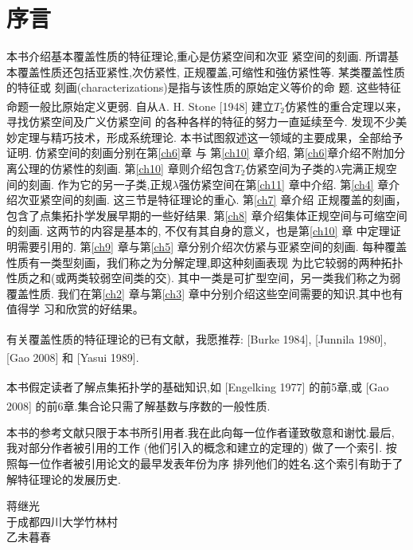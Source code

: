 \chapter*{序\quad 言}

\setcounter{page}{1}
\thispagestyle{empty}

本书介绍基本覆盖性质的特征理论,重心是仿紧空间和次亚
紧空间的刻画.
所谓基本覆盖性质还包括亚紧性,次仿紧性,
正规覆盖,可缩性和強仿紧性等.
某类覆盖性质的特征或
刻画(characterizations)是指与该性质的原始定义等价的命
题.
这些特征命题一般比原始定义更弱.
自从A. H. Stone [1948]\textsuperscript{\cite{Stone}}
建立$T_2$仿紧性的重合定理以来，寻找仿紧空间及广义仿紧空间
的各种各样的特征的努力一直延续至今.
发现不少美妙定理与精巧技术，形成系统理论.
本书试图叙述这一领域的主要成果，全部给予证明.
仿紧空间的刻画分别在第\ref{ch6}章 与
第\ref{ch10} 章介绍, 第\ref{ch6}章介绍不附加分离公理的仿紧性的刻画.
第\ref{ch10} 章则介绍包含$T_2$仿紧空间为子类的$\lambda$完满正规空间的刻画.
作为它的另一子类,正规$\lambda$强仿紧空间在第\ref{ch11} 章中介绍.
第\ref{ch4} 章介绍次亚紧空间的刻画.
这三节是特征理论的重心. 第\ref{ch7} 章介绍
正规覆盖的刻画，包含了点集拓扑学发展早期的一些好结果.
第\ref{ch8} 章介绍集体正规空间与可缩空间的刻画.
这两节的内容是基本的, 不仅有其自身的意义，也是第\ref{ch10} 章 中定理证明需要引用的.
第\ref{ch9} 章与第\ref{ch5} 章分别介绍次仿紧与亚紧空间的刻画.
每种覆盖性质有一类型刻画，我们称之为分解定理,即这种刻画表现
为比它较弱的两种拓扑性质之和(或两类较弱空间类的交).
其中一类是可扩型空间，另一类我们称之为弱覆盖性质.
我们在第\ref{ch2} 章与第\ref{ch3} 章中分别介绍这些空间需要的知识.其中也有值得学
习和欣赏的好结果。

有关覆盖性质的特征理论的已有文献，我愿推荐: 
[Burke 1984]\textsuperscript{\cite{Burke1984}}, 
[Junnila 1980]\textsuperscript{\cite{Junnila1980}}, 
[Gao 2008]\textsuperscript{\cite{Gao2008}}
 和 [Yasui 1989]\textsuperscript{\cite{Yasui1989}}.

本书假定读者了解点集拓扑学的基础知识,如 
[Engelking 1977]\textsuperscript{\cite{Engelking1977}}
的前5章,或
[Gao 2008]\textsuperscript{\cite{Gao2008}} 
的前6章.集合论只需了解基数与序数的一般性质.

本书的参考文献只限于本书所引用者.我在此向每一位作者谨致敬意和谢忱.最后, 我对部分作者被引用的工作 (他们引入的概念和建立的定理的) 做了一个索引.
按照每一位作者被引用论文的最早发表年份为序
排列他们的姓名.这个索引有助于了解特征理论的发展历史.

{\kaishu
	\begin{center}
		\hspace*{85mm}蒋继光\\
		\hspace*{85mm}于成都四川大学竹林村\\
		\hspace*{85mm}乙未暮春
	\end{center}
}


